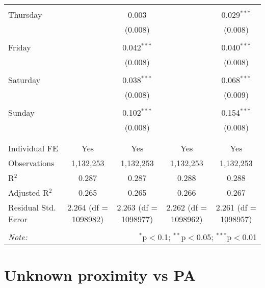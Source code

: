 \documentclass[
]{article}
\begin{document}
\begin{table}[!htbp]
{\begin{tabular}{@{\extracolsep{5pt}}lcccc}
  & & & & \\ 
 Thursday &  & 0.003 &  & 0.029$^{***}$ \\ 
  &  & (0.008) &  & (0.008) \\ 
  & & & & \\ 
 Friday &  & 0.042$^{***}$ &  & 0.040$^{***}$ \\ 
  &  & (0.008) &  & (0.008) \\ 
  & & & & \\ 
 Saturday &  & 0.038$^{***}$ &  & 0.068$^{***}$ \\ 
  &  & (0.008) &  & (0.009) \\ 
  & & & & \\ 
 Sunday &  & 0.102$^{***}$ &  & 0.154$^{***}$ \\ 
  &  & (0.008) &  & (0.008) \\ 
  & & & & \\ 
\hline \\[-1.8ex] 
Individual FE & Yes & Yes & Yes & Yes \\ 
Observations & 1,132,253 & 1,132,253 & 1,132,253 & 1,132,253 \\ 
R$^{2}$ & 0.287 & 0.287 & 0.288 & 0.288 \\ 
Adjusted R$^{2}$ & 0.265 & 0.265 & 0.266 & 0.267 \\ 
Residual Std. Error & 2.264 (df = 1098982) & 2.263 (df = 1098977) & 2.262 (df = 1098962) & 2.261 (df = 1098957) \\ 
\hline 
\hline \\[-1.8ex] 
\textit{Note:}  & \multicolumn{4}{r}{$^{*}$p$<$0.1; $^{**}$p$<$0.05; $^{***}$p$<$0.01} \\ 
\end{tabular}
} 
\end{table} 
\newpage
\section{Unknown proximity vs PA}
\end{document}
